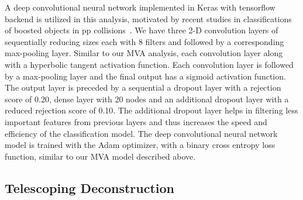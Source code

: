 \documentclass[notoc]{JHEP3}
\begin{document}
	A deep convolutional neural network implemented in Keras with tensorflow backend is utilized in this analysis, motivated by recent studies in classifications of boosted objects in pp collisions~\cite{}. We have three 2-D convolution layers of sequentially reducing sizes each with 8 filters and followed by a corresponding max-pooling layer. Similar to our MVA analysis, each convolution layer  along with a hyperbolic tangent activation function. Each convolution layer is followed by a max-pooling layer and the final output has a sigmoid activation function. The output layer is preceded by a sequential a dropout layer with a rejection score of 0.20, dense layer with 20 nodes and an additional dropout layer with a reduced rejection score of 0.10. The additional dropout layer helps in filtering less important features from previous layers and thus increases the speed and efficiency of the classification model. The deep convolutional neural network model is trained with the Adam optimizer, with a binary cross entropy loss function, similar to our MVA model described above.
	


\subsection{Telescoping Deconstruction}
\label{sec:tjet}
	
\end{document}
